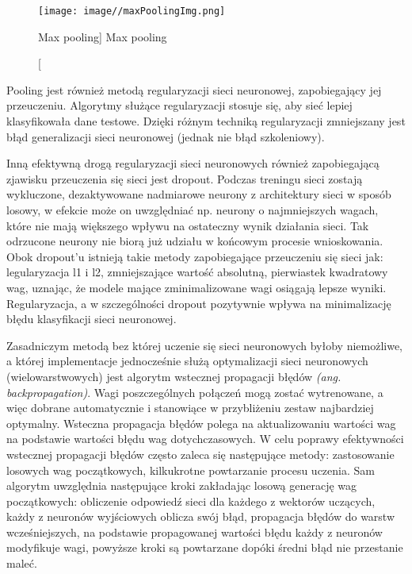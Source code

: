 \documentclass[a4paper,12pt]{article}
\begin{document}
			\begin{figure}[!ht]
				\centering
				\texttt{[image: image//maxPoolingImg.png]}
				\caption
				[Max pooling]
				{Max pooling}
				\label{fig:maxPooling}
			\end{figure}
        
			Pooling jest również metodą regularyzacji sieci neuronowej, zapobiegający jej przeuczeniu. Algorytmy służące regularyzacji stosuje się, aby sieć lepiej klasyfikowała dane testowe. Dzięki różnym techniką regularyzacji zmniejszany jest błąd generalizacji sieci neuronowej (jednak nie błąd szkoleniowy). 
        
        Inną efektywną drogą regularyzacji sieci neuronowych również zapobiegającą zjawisku przeuczenia się sieci jest dropout. 
			Podczas treningu sieci zostają wykluczone, dezaktywowane nadmiarowe neurony z architektury sieci w sposób losowy, 
			w efekcie może on uwzględniać np. neurony o najmniejszych wagach, które nie mają większego wpływu na ostateczny wynik działania sieci. 
			Tak odrzucone neurony nie biorą już udziału w końcowym procesie wnioskowania. Obok dropout'u istnieją takie metody zapobiegające 
			przeuczeniu się sieci jak: legularyzacja l1 i l2, zmniejszające wartość absolutną, pierwiastek kwadratowy wag, uznając, że modele mające 
			zminimalizowane wagi osiągają lepsze wyniki. Regularyzacja, a w szczególności dropout pozytywnie wpływa na minimalizację błędu 
			klasyfikacji sieci neuronowej. \cite{15}
        
        Zasadniczym metodą bez której uczenie się sieci neuronowych byłoby niemożliwe, a której implementacje jednocześnie służą optymalizacji sieci neuronowych (wielowarstwowych) jest algorytm wstecznej propagacji błędów 
			\textit{(ang. backpropagation)}. Wagi poszczególnych połączeń mogą zostać wytrenowane, a więc dobrane automatycznie i stanowiące 
			w przybliżeniu zestaw najbardziej optymalny. Wsteczna propagacja błędów polega na aktualizowaniu wartości wag na podstawie wartości błędu 
			wag dotychczasowych. W celu poprawy efektywności wstecznej propagacji błędów często zaleca się następujące metody: 
			zastosowanie losowych wag początkowych, kilkukrotne powtarzanie procesu uczenia. Sam algorytm uwzględnia następujące kroki 
			zakładając losową generację wag początkowych: obliczenie odpowiedź sieci dla każdego z wektorów uczących, 
			każdy z neuronów wyjściowych oblicza swój błąd, propagacja błędów do warstw wcześniejszych, na podstawie propagowanej wartości 
			błędu każdy z neuronów modyfikuje wagi, powyższe kroki są powtarzane dopóki średni błąd nie przestanie maleć.
\end{document}
